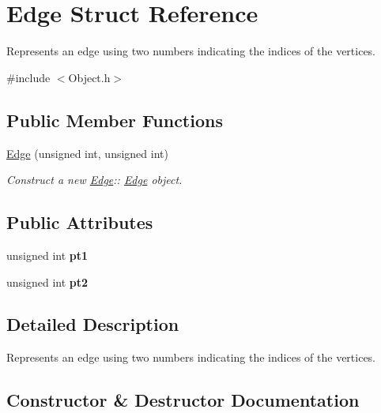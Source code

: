 \hypertarget{structEdge}{}\section{Edge Struct Reference}
\label{structEdge}


Represents an edge using two numbers indicating the indices of the vertices.  




{\ttfamily \#include $<$Object.\+h$>$}

\subsection*{Public Member Functions}
\begin{DoxyCompactItemize}
\item 
\hyperlink{structEdge_a1e3224e7462780a5e96b4739d87b193a}{Edge} (unsigned int, unsigned int)
\begin{DoxyCompactList}\small\item\em Construct a new \hyperlink{structEdge}{Edge}\+:\+: \hyperlink{structEdge}{Edge} object. \end{DoxyCompactList}\end{DoxyCompactItemize}
\subsection*{Public Attributes}
\begin{DoxyCompactItemize}
\item 
\mbox{\label{structEdge_a66c332dc9a494cb75c2c9c75479733b3}} 
unsigned int {\bfseries pt1}
\item 
\mbox{\label{structEdge_a7ccfa13b6e78192e24003f6da35707d0}} 
unsigned int {\bfseries pt2}
\end{DoxyCompactItemize}


\subsection{Detailed Description}
Represents an edge using two numbers indicating the indices of the vertices. 

\subsection{Constructor \& Destructor Documentation}
\mbox{\label{structEdge_a1e3224e7462780a5e96b4739d87b193a}} 
